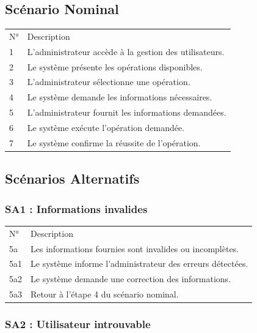 \documentclass[
]{book}
\begin{document}
\hypertarget{scuxe9nario-nominal-5}{%
\subsection{Scénario Nominal}\label{scuxe9nario-nominal-5}}

\begin{longtable}[]{@{}ll@{}}
\toprule
\endhead
N° & Description \\
1 & L'administrateur accède à la gestion des utilisateurs. \\
2 & Le système présente les opérations disponibles. \\
3 & L'administrateur sélectionne une opération. \\
4 & Le système demande les informations nécessaires. \\
5 & L'administrateur fournit les informations demandées. \\
6 & Le système exécute l'opération demandée. \\
7 & Le système confirme la réussite de l'opération. \\
\bottomrule
\end{longtable}

\hypertarget{scuxe9narios-alternatifs-5}{%
\subsection{Scénarios Alternatifs}\label{scuxe9narios-alternatifs-5}}

\hypertarget{sa1-informations-invalides}{%
\subsubsection{SA1 : Informations
invalides}\label{sa1-informations-invalides}}

\begin{longtable}[]{@{}ll@{}}
\toprule
\endhead
N° & Description \\
5a & Les informations fournies sont invalides ou incomplètes. \\
5a1 & Le système informe l'administrateur des erreurs détectées. \\
5a2 & Le système demande une correction des informations. \\
5a3 & Retour à l'étape 4 du scénario nominal. \\
\bottomrule
\end{longtable}

\hypertarget{sa2-utilisateur-introuvable}{%
\subsubsection{SA2 : Utilisateur
introuvable}\label{sa2-utilisateur-introuvable}}
\end{document}
